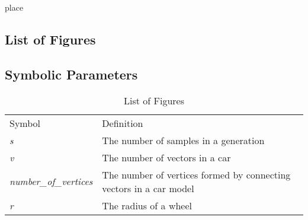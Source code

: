 \documentclass[12pt, titlepage]{article}
\begin{document}
place

\subsection{List of Figures}

\subsection{Symbolic Parameters}

\begin{table}[h!]
\centering
\label{LOF}
\begin{tabular}{ll}
Symbol & Definition \\
\textit{s} & The number of samples in a generation  \\
\textit{v} & The number of vectors in a car  \\
\textit{number\_of\_vertices} & The number of vertices formed by connecting 
vectors in a car model \\
\textit{r} & The radius of a wheel
\end{tabular}
\caption{List of Figures}
\end{table}
\end{document}
